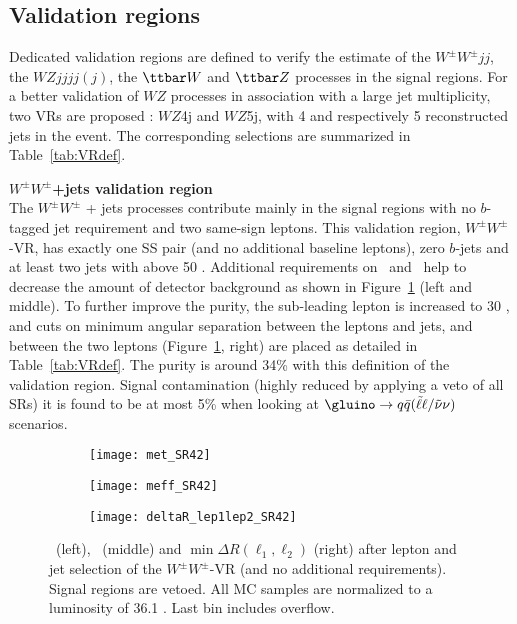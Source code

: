\subsection{Validation regions}
\label{sec:bkg.irred.def}

Dedicated validation regions are defined to verify the estimate
of the $W^\pm W^\pm jj$, the $WZjjjj(j)$, the $\ttbar W$ and $\ttbar Z$ 
processes in the signal regions. 
For a better validation of $WZ$ processes in association with a large jet 
multiplicity, two VRs are proposed : $WZ$4j and $WZ$5j, with 4 and
respectively 5 reconstructed jets in the event.
The corresponding selections are summarized in Table~\ref{tab:VRdef}.

\par{\bf $W^\pm W^\pm$+jets validation region\\}
The $W^{\pm}W^{\pm}$ + jets processes contribute mainly in the signal regions with no $b$-tagged jet requirement and two same-sign leptons. This validation region, $W^\pm W^{\pm}$-VR, has exactly one SS pair (and no additional baseline leptons), zero $b$-jets and at least two jets with \pt above 50 \GeV. Additional requirements on \met\ and \meff\ help to decrease the amount of detector background as shown in Figure~\ref{fig:WW_VR_afterLepJetSel} (left and middle). To further improve the purity, the sub-leading lepton \pt is increased to 30 \GeV, and cuts on minimum angular separation between the leptons and jets, and between the two leptons (Figure~\ref{fig:WW_VR_afterLepJetSel}, right) are placed as detailed in Table~\ref{tab:VRdef}. The purity is around 34\% with this definition 
of the validation region. Signal contamination (highly reduced by applying a veto of all SRs) it is found to be at most 5\% when looking at $\gluino \rightarrow q\bar q (\tilde \ell \ell / \tilde \nu \nu)$ scenarios.

\begin{figure}[t!]
\centering
\begin{subfigure}[t]{0.32\textwidth}
\texttt{[image: met\_SR42]}
\end{subfigure}
\begin{subfigure}[t]{0.32\textwidth}
\texttt{[image: meff\_SR42]}
\end{subfigure}
\begin{subfigure}[t]{0.32\textwidth}
\texttt{[image: deltaR\_lep1lep2\_SR42]}
\end{subfigure}
\caption{\met\ (left), \meff\ (middle) and $\operatorname{min}\Delta R (\ell_{1}, \ell_2)$ (right) after lepton and jet selection of the $W^\pm W^\pm$-VR (and no additional requirements). Signal regions are vetoed. All MC samples are normalized to a luminosity of 36.1 \ifb. Last bin includes overflow.
}
\label{fig:WW_VR_afterLepJetSel}
\end{figure} 


